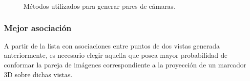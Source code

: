  \begin{figure}[!ht]
   \centering 
    \hspace{2cm}
   \caption{Métodos utilizados para generar pares de cámaras.}  
   \label{img_asociacion} 
 \end{figure} 





\subsubsection*{Mejor asociación}

A partir de la lista con asociaciones entre puntos de dos vistas generada anteriormente, es necesario elegir aquella que posea mayor probabilidad de conformar la pareja de imágenes correspondiente a la proyección de un marcador 3D sobre dichas vistas.


